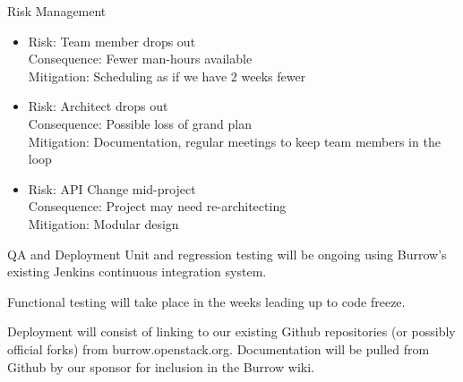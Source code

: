 \documentclass{beamer}
\begin{document}
\begin{frame}{Risk Management}
  \begin{itemize}
  \item Risk: Team member drops out\\
    Consequence: Fewer man-hours available\\
    Mitigation: Scheduling as if we have 2 weeks fewer\\
  \item Risk: Architect drops out\\
    Consequence: Possible loss of grand plan\\
    Mitigation: Documentation, regular meetings to keep team members in the loop\\
  \item Risk: API Change mid-project\\
    Consequence: Project may need re-architecting\\
    Mitigation: Modular design\\
  \end{itemize}
\end{frame}

\begin{frame}{QA and Deployment}
  Unit and regression testing will be ongoing using Burrow's existing Jenkins continuous integration system.
  
  Functional testing will take place in the weeks leading up to code freeze.

  Deployment will consist of linking to our existing Github repositories (or possibly official forks)
  from burrow.openstack.org.  Documentation will be pulled from Github by our sponsor for inclusion in the Burrow wiki.
\end{frame}
\end{document}
